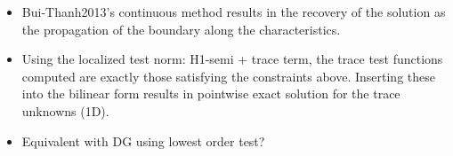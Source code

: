 \begin{itemize}
\item Bui-Thanh2013's continuous method results in the recovery of the solution as the propagation of the boundary along
the characteristics.
\item Using the localized test norm: H1-semi + trace term, the trace test functions computed are exactly those
satisfying the constraints above. Inserting these into the bilinear form results in pointwise exact solution for the
trace unknowns (1D).
\item Equivalent with DG using lowest order test?
\end{itemize}


